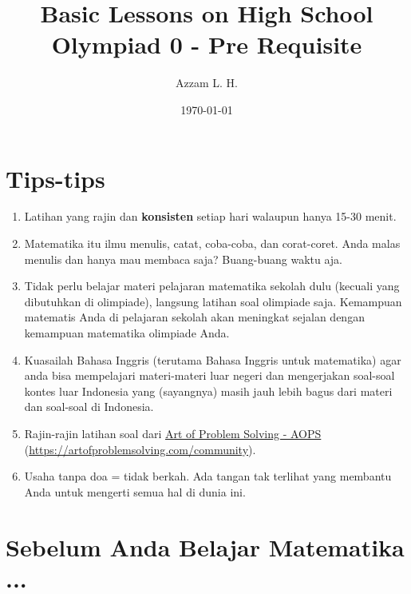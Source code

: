 \title{Basic Lessons on High School Olympiad 0 - Pre Requisite} 
\date{\today}
\author{Azzam L. H.}
\maketitle
\renewcommand*\contentsname{Daftar Isi}
\tableofcontents
 
 \section{Tips-tips}
	\begin{enumerate}
	    \item Latihan yang rajin dan \textbf{konsisten} setiap hari walaupun hanya 15-30 menit.
	    \item Matematika itu ilmu menulis, catat, coba-coba, dan corat-coret. Anda malas menulis dan hanya mau membaca saja? Buang-buang waktu aja.
	    \item Tidak perlu belajar materi pelajaran matematika sekolah dulu (kecuali yang dibutuhkan di olimpiade), langsung latihan soal olimpiade saja. Kemampuan matematis Anda di pelajaran sekolah akan meningkat sejalan dengan kemampuan matematika olimpiade Anda.
	    \item Kuasailah Bahasa Inggris (terutama Bahasa Inggris untuk matematika) agar anda bisa mempelajari materi-materi luar negeri dan mengerjakan soal-soal kontes luar Indonesia yang (sayangnya) masih jauh lebih bagus dari materi dan soal-soal di Indonesia.
	    \item Rajin-rajin latihan soal dari \href{https://artofproblemsolving.com/community}{Art of Problem Solving - AOPS} (\href{https://artofproblemsolving.com/community}{https://artofproblemsolving.com/community}).
	    \item Usaha tanpa doa = tidak berkah. Ada tangan tak terlihat yang membantu Anda untuk mengerti semua hal di dunia ini.

	\end{enumerate}
	
	\section{Sebelum Anda Belajar Matematika ...}
